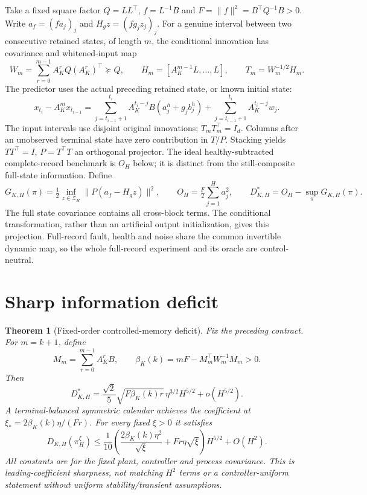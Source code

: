 \documentclass[11pt]{article}
\newtheorem{theorem}{Theorem}
\begin{document}
Take a fixed square factor $Q=LL^\top$, $f=L^{-1}B$ and
$F=\|f\|^2=B^\top Q^{-1}B>0$.
Write $a_f=(f a_j)_j$ and $H_gz=(f g_j z_j)_j$.
For a genuine interval between two consecutive retained states, of length $m$,
the conditional innovation has covariance and whitened-input map
\[
W_m=\sum_{r=0}^{m-1}A_K^rQ(A_K^r)^\top\succeq Q,\qquad
H_m=[A_K^{m-1}L,\ldots,L],\qquad T_m=W_m^{-1/2}H_m .
\]
The predictor uses the actual preceding retained state, or known initial state:
\[
x_{t_i}-A_K^m x_{t_{i-1}}
=\sum_{j=t_{i-1}+1}^{t_i}A_K^{t_i-j}B(a_j^h+g_jb_j^h)
+\sum_{j=t_{i-1}+1}^{t_i}A_K^{t_i-j}w_j .
\]
The input intervals use disjoint original innovations; $T_mT_m^\top=I_d$.
Columns after an unobserved terminal state have zero contribution in $T/P$.
Stacking yields $TT^\top=I$, $P=T^\top T$ an orthogonal projector.
The ideal healthy-subtracted complete-record benchmark is $O_H$ below;
it is distinct from the still-composite full-state information. Define
\[
G_{K,H}(\pi)=\tfrac12\inf_{z\in\mathcal Z_H}\|P(a_f-H_gz)\|^2,\qquad
O_H=\tfrac F2\sum_{j=1}^H a_j^2,\qquad
D_{K,H}^*=O_H-\sup_\pi G_{K,H}(\pi).
\]
The full state covariance contains all cross-block terms. The conditional
transformation, rather than an artificial output initialization, gives this
projection. Full-record fault, health and noise share the common invertible
dynamic map, so the whole full-record experiment and its oracle are
control-neutral.

\section{Sharp information deficit}\begin{theorem}[Fixed-order controlled-memory deficit]\label{thm:main}
Fix the preceding contract. For $m=k+1$, define
\[
M_m=\sum_{r=0}^{m-1}A_K^rB,\qquad
\beta_K(k)=mF-M_m^\top W_m^{-1}M_m>0.
\]
Then
\begin{equation}\label{eq:sharp}
D_{K,H}^*=\frac{\sqrt2}{5}\sqrt{F\beta_K(k)r}\,\eta^{3/2}H^{5/2}
+o(H^{5/2}).
\end{equation}
A terminal-balanced symmetric calendar achieves the coefficient at
$\xi_*=2\beta_K(k)\eta/(Fr)$. For every fixed $\xi>0$ it satisfies
\begin{equation}\label{eq:upper}
D_{K,H}(\pi_H^\xi)\le\frac1{10}
\left(\frac{2\beta_K(k)\eta^2}{\sqrt\xi}+Fr\eta\sqrt\xi\right)H^{5/2}
+O(H^2).
\end{equation}
All constants are for the fixed plant, controller and process covariance.
This is leading-coefficient sharpness, not matching $H^2$ terms or a
controller-uniform statement without uniform stability/transient assumptions.
\end{theorem}
\end{document}
